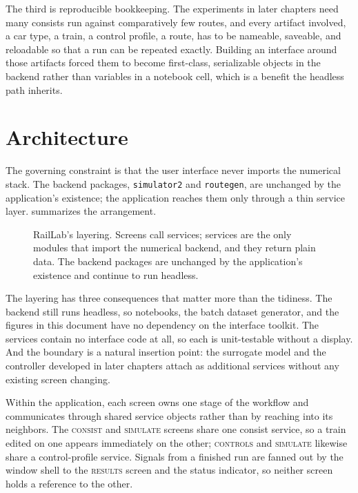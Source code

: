 The third is reproducible bookkeeping. The experiments in later chapters need many consists run against comparatively few routes, and every artifact involved, a car type, a train, a control profile, a route, has to be nameable, saveable, and reloadable so that a run can be repeated exactly. Building an interface around those artifacts forced them to become first-class, serializable objects in the backend rather than variables in a notebook cell, which is a benefit the headless path inherits.

\section{Architecture}
\label{sec:raillab_architecture}

The governing constraint is that the user interface never imports the numerical stack. The backend packages, \texttt{simulator2} and \texttt{routegen}, are unchanged by the application's existence; the application reaches them only through a thin service layer.  summarizes the arrangement.

\begin{figure}[htbp]
\centering
\caption{RailLab's layering. Screens call services; services are the only modules that import the numerical backend, and they return plain data. The backend packages are unchanged by the application's existence and continue to run headless.}
\label{fig:raillab_stack}
\end{figure}

The layering has three consequences that matter more than the tidiness. The backend still runs headless, so notebooks, the batch dataset generator, and the figures in this document have no dependency on the interface toolkit. The services contain no interface code at all, so each is unit-testable without a display. And the boundary is a natural insertion point: the surrogate model and the controller developed in later chapters attach as additional services without any existing screen changing.

Within the application, each screen owns one stage of the workflow and communicates through shared service objects rather than by reaching into its neighbors. The \textsc{consist} and \textsc{simulate} screens share one consist service, so a train edited on one appears immediately on the other; \textsc{controls} and \textsc{simulate} likewise share a control-profile service. Signals from a finished run are fanned out by the window shell to the \textsc{results} screen and the status indicator, so neither screen holds a reference to the other.


